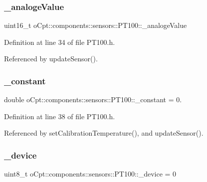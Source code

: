 \subsubsection{\texorpdfstring{\+\_\+analoge\+Value}{\_analogeValue}}
{\footnotesize\ttfamily uint16\+\_\+t o\+Cpt\+::components\+::sensors\+::\+P\+T100\+::\+\_\+analoge\+Value\hspace{0.3cm}{\ttfamily [private]}}



Definition at line 34 of file P\+T100.\+h.



Referenced by update\+Sensor().

\hypertarget{classo_cpt_1_1components_1_1sensors_1_1_p_t100_a9a38493994b9ec216a5a0d29f3c31cc3}{}\label{classo_cpt_1_1components_1_1sensors_1_1_p_t100_a9a38493994b9ec216a5a0d29f3c31cc3} 
\subsubsection{\texorpdfstring{\+\_\+constant}{\_constant}}
{\footnotesize\ttfamily double o\+Cpt\+::components\+::sensors\+::\+P\+T100\+::\+\_\+constant = 0.\hspace{0.3cm}{\ttfamily [private]}}



Definition at line 38 of file P\+T100.\+h.



Referenced by set\+Calibration\+Temperature(), and update\+Sensor().

\hypertarget{classo_cpt_1_1components_1_1sensors_1_1_p_t100_af67b953bcfc2a50b211a36a6df5f311c}{}\label{classo_cpt_1_1components_1_1sensors_1_1_p_t100_af67b953bcfc2a50b211a36a6df5f311c} 
\subsubsection{\texorpdfstring{\+\_\+device}{\_device}}
{\footnotesize\ttfamily uint8\+\_\+t o\+Cpt\+::components\+::sensors\+::\+P\+T100\+::\+\_\+device = 0\hspace{0.3cm}{\ttfamily [private]}}



